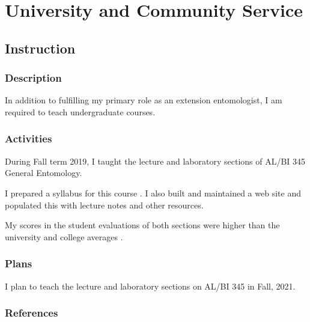\pagebreak
\section{University and Community Service}

\subsection{Instruction}
\begin{refsection}
	
\subsubsection{Description}

In addition to fulfilling my primary role as an extension entomologist, I am required to teach undergraduate courses.

\subsubsection{Activities}

During Fall term 2019, I taught the lecture and laboratory sections of AL/BI 345 General Entomology.

I prepared a syllabus for this course \cite{moore_syllabus_2019}. I also built and maintained a web site \cite{moore_web_2019-1} and populated this with lecture notes and other resources.

My scores in the student evaluations of both sections were higher than the university and college averages \cite{moore_student_2019}.

\subsubsection{Plans}

I plan to teach the lecture and laboratory sections on AL/BI 345 in Fall, 2021.

\subsubsection{References}
\printbibliography[heading=none]
\end{refsection}

